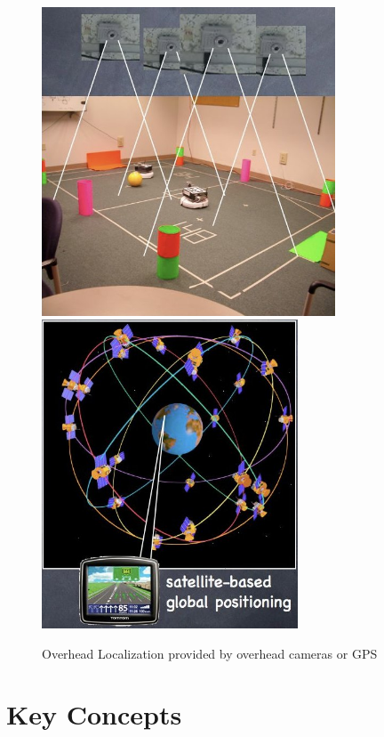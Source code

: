 \begin{figure}
\centerline{
\mbox{\includegraphics[width=3.44in]{figures/8_overhead_loc.jpg}}
\mbox{\includegraphics[width=3.00in]{figures/8_gps.jpg}}
}
\caption{Overhead Localization provided by overhead cameras or GPS}
\end{figure}

\section{Key Concepts}

